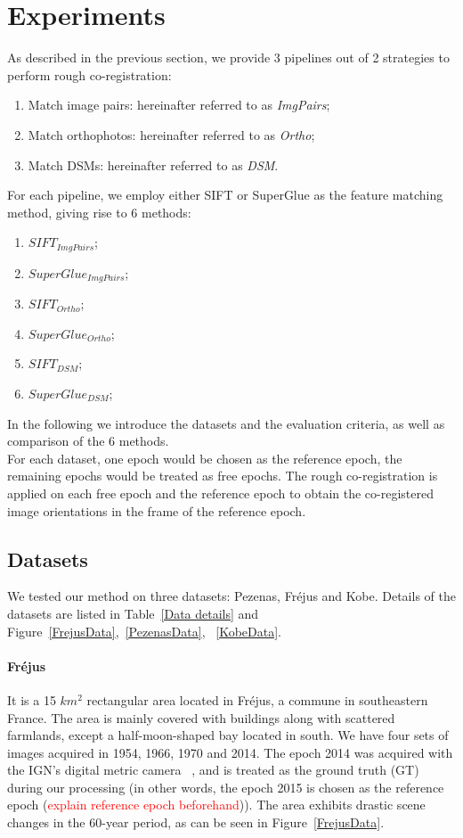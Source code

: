 \section{Experiments}
As described in the previous section, we provide 3 pipelines out of 2 strategies to perform rough co-registration:\\
\begin{enumerate}
    \item Match image pairs: hereinafter referred to as \textit{ImgPairs};
    \item Match orthophotos: hereinafter referred to as \textit{Ortho};
    \item Match DSMs: hereinafter referred to as \textit{DSM}.
\end{enumerate}
For each pipeline, we employ either SIFT or SuperGlue as the feature matching method, giving rise to 6 methods:\\
\begin{enumerate}
    \item $SIFT_{ImgPairs}$;
    \item $SuperGlue_{ImgPairs}$;
    \item $SIFT_{Ortho}$;
    \item $SuperGlue_{Ortho}$;
    \item $SIFT_{DSM}$;
    \item $SuperGlue_{DSM}$;
\end{enumerate}
In the following we introduce the datasets and the evaluation criteria, as well as comparison of the 6 methods.\\
For each dataset, one epoch would be chosen as the reference epoch, the remaining epochs would be treated as free epochs. The rough co-registration is applied on each free epoch and the reference epoch to obtain the co-registered image orientations in the frame of the reference epoch.\\

\subsection{Datasets}
We tested our method on three datasets: Pezenas, Fr{\'e}jus and Kobe. Details of the datasets are listed in Table~\ref{Data details} and Figure~\ref{FrejusData},~\ref{PezenasData}, ~\ref{KobeData}.
\par
\paragraph{Fr{\'e}jus} It is a 15 $km^2$ rectangular area located in Fr{\'e}jus, a commune in southeastern France. The area is mainly covered with buildings along with scattered farmlands, except a half-moon-shaped bay located in south. We have four sets of images acquired in 1954, 1966, 1970 and 2014. The epoch 2014 was acquired with the IGN's digital metric camera ~\cite{souchon2010ign}, and is treated as the ground truth (GT) during our processing (in other words, the epoch 2015 is chosen as the reference epoch (\textcolor{red}{explain reference epoch beforehand})). The area exhibits drastic scene changes in the 60-year period, as can be seen in Figure~\ref{FrejusData}.\\
